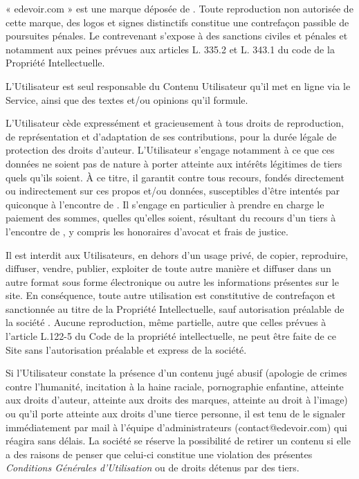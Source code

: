 « edevoir.com » est une marque déposée de \eDevoir. Toute reproduction non autorisée de cette marque, des logos et signes distinctifs constitue une contrefaçon passible de poursuites pénales. Le contrevenant s'expose à des sanctions civiles et pénales et notamment aux peines prévues aux articles L. 335.2 et L. 343.1 du code de la Propriété Intellectuelle.

L'Utilisateur est seul responsable du Contenu Utilisateur qu'il met en ligne via le Service, ainsi que des textes et/ou opinions qu'il formule.

L'Utilisateur cède expressément et gracieusement à \eDevoir tous droits de reproduction, de représentation et d'adaptation de ses contributions, pour la durée légale de protection des droits d'auteur. L'Utilisateur s'engage notamment à ce que ces données ne soient pas de nature à porter atteinte aux intérêts légitimes de tiers quels qu'ils soient. À ce titre, il garantit \eDevoir contre tous recours, fondés directement ou indirectement sur ces propos et/ou données, susceptibles d'être intentés par quiconque à l'encontre de \eDevoir. Il s'engage en particulier à prendre en charge le paiement des sommes, quelles qu'elles soient, résultant du recours d'un tiers à l'encontre de \eDevoir, y compris les honoraires d'avocat et frais de justice.

Il est interdit aux Utilisateurs, en dehors d'un usage privé, de copier, reproduire, diffuser, vendre, publier, exploiter de toute autre manière et diffuser dans un autre format sous forme électronique ou autre les informations présentes sur le site. En conséquence, toute autre utilisation est constitutive de contrefaçon et sanctionnée au titre de la Propriété Intellectuelle, sauf autorisation préalable de la société \eDevoir. Aucune reproduction, même partielle, autre que celles prévues à l'article L.122-5 du Code de la propriété intellectuelle, ne peut être faite de ce Site sans l'autorisation préalable et express de la société.

Si l'Utilisateur constate la présence d'un contenu jugé abusif (apologie de crimes contre l'humanité, incitation à la haine raciale, pornographie enfantine, atteinte aux droits d'auteur, atteinte aux droits des marques, atteinte au droit à l'image) ou qu'il porte atteinte aux droits d'une tierce personne, il est tenu de le signaler immédiatement par mail à l'équipe d'administrateurs (contact@edevoir.com) qui réagira sans délais. La société \eDevoir se réserve la possibilité de retirer un contenu si elle a des raisons de penser que celui-ci constitue une violation des présentes \textit{Conditions Générales d'Utilisation} ou de droits détenus par des tiers.

